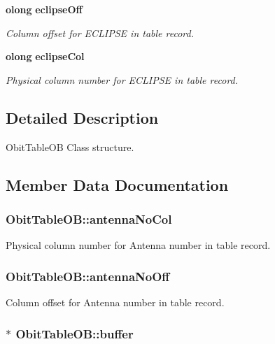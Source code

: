 \begin{CompactItemize}
{\bf olong} {\bf eclipse\-Off}
\begin{CompactList}\small\item\em Column offset for ECLIPSE in table record. \item\end{CompactList}\item 
{\bf olong} {\bf eclipse\-Col}
\begin{CompactList}\small\item\em Physical column number for ECLIPSE in table record. \item\end{CompactList}\end{CompactItemize}


\subsection{Detailed Description}
Obit\-Table\-OB Class structure. 



\subsection{Member Data Documentation}
\subsubsection{ {\bf Obit\-Table\-OB::antenna\-No\-Col}}\label{structObitTableOB_o17}


Physical column number for Antenna number in table record. 

\subsubsection{ {\bf Obit\-Table\-OB::antenna\-No\-Off}}\label{structObitTableOB_o16}


Column offset for Antenna number in table record. 

\subsubsection{$\ast$ {\bf Obit\-Table\-OB::buffer}}\label{structObitTableOB_o10}


